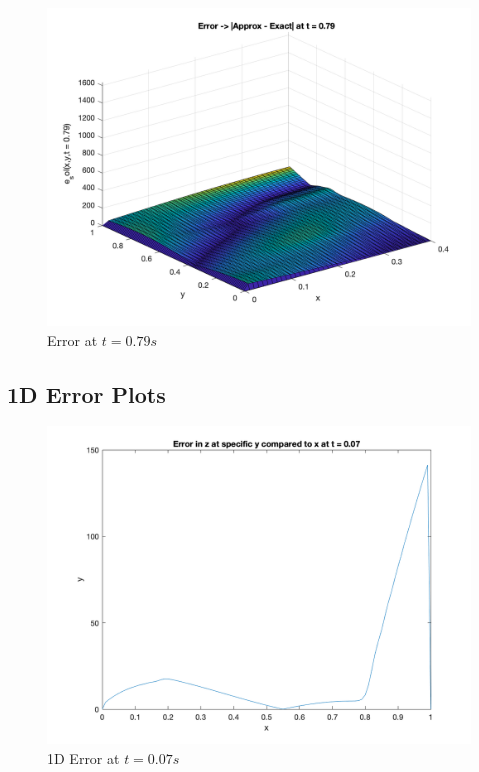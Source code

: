 \documentclass[conf]{new-aiaa}
\begin{document}
\begin{figure}[H]
    \begin{center}
    \includegraphics [width= .8\linewidth]{figures/Error_t079.png}
    \caption{Error at $t=0.79s$}
    \label{fig_errt079}
    \end{center}
\end{figure}


\subsection{1D Error Plots}

\begin{figure}[H]
    \begin{center}
    \includegraphics [width= .7\linewidth]{figures/error_at_specific_y_t007.png}
    \caption{1D Error at $t=0.07s$}
    \label{fig_1d07}
    \end{center}
\end{figure}
\end{document}
